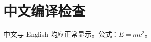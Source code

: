 \documentclass[12pt]{article}
\begin{document}
\section{中文编译检查}
中文与 English 均应正常显示。公式：\(E=mc^2\)。
\end{document}
